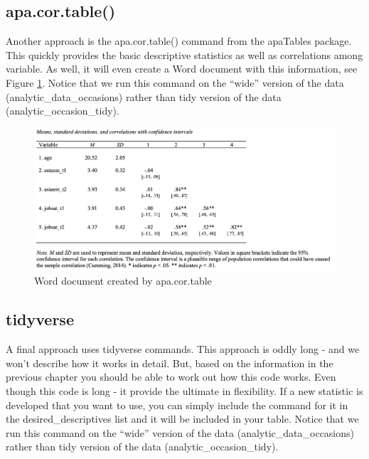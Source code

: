 \documentclass[
]{krantz}
\makeatletter
\newenvironment{Shaded}{\begin{snugshade}}{\end{snugshade}}
\newcommand{\DataTypeTok}[1]{\textcolor[rgb]{0.27,0.27,0.27}{#1}}
\newcommand{\KeywordTok}[1]{\textcolor[rgb]{0.27,0.27,0.27}{\textbf{#1}}}
\newcommand{\NormalTok}[1]{#1}
\newcommand{\OperatorTok}[1]{\textcolor[rgb]{0.43,0.43,0.43}{\textbf{#1}}}
\newcommand{\StringTok}[1]{\textcolor[rgb]{0.5,0.5,0.5}{#1}}
\newenvironment{kframe}{%
\medskip{}
\setlength{\fboxsep}{.8em}
 \def\at@end@of@kframe{}%
 \ifinner\ifhmode%
  \def\at@end@of@kframe{\end{minipage}}%
  \begin{minipage}{\columnwidth}%
 \fi\fi%
 \def\FrameCommand##1{\hskip\@totalleftmargin \hskip-\fboxsep
 \colorbox{shadecolor}{##1}\hskip-\fboxsep
     \hskip-\linewidth \hskip-\@totalleftmargin \hskip\columnwidth}%
 \MakeFramed {\advance\hsize-\width
   \@totalleftmargin\z@ \linewidth\hsize
   \@setminipage}}%
 {\par\unskip\endMakeFramed%
 \at@end@of@kframe}
\renewenvironment{Shaded}{\begin{kframe}}{\end{kframe}}
\makeatother
\begin{document}
\hypertarget{apa.cor.table}{%
\subsection{apa.cor.table()}\label{apa.cor.table}}

Another approach is the apa.cor.table() command from the apaTables package. This quickly provides the basic descriptive statistics as well as correlations among variable. As well, it will even create a Word document with this information, see Figure \ref{fig:descapa}. Notice that we run this command on the ``wide'' version of the data (analytic\_data\_occasions) rather than tidy version of the data (analytic\_occasion\_tidy).

\begin{Shaded}
\end{Shaded}

\begin{figure}
\includegraphics[width=1\linewidth]{ch_enter_load/images/desc_apa} \caption{Word document created by apa.cor.table}\label{fig:descapa}
\end{figure}

\hypertarget{tidyverse}{%
\subsection{tidyverse}\label{tidyverse}}

A final approach uses tidyverse commands. This approach is oddly long - and we won't describe how it works in detail. But, based on the information in the previous chapter you should be able to work out how this code works. Even though this code is long - it provide the ultimate in flexibility. If a new statistic is developed that you want to use, you can simply include the command for it in the desired\_descriptives list and it will be included in your table. Notice that we run this command on the ``wide'' version of the data (analytic\_data\_occasions) rather than tidy version of the data (analytic\_occasion\_tidy).
\end{document}
